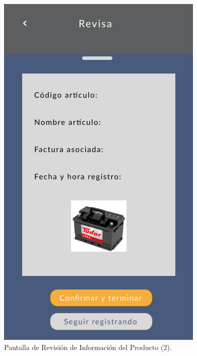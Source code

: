 \documentclass{scrreprt}
\begin{document}
    \begin{figure}[!htpb]
        \centerline{\includegraphics[scale=.35]{images/prototype/mobile/iPhone 8 - 6.png}}
        \caption{Pantalla de Revisión de Información del Producto (2).}
        \label{fig}
    \end{figure}
    \FloatBarrier
\end{document}
